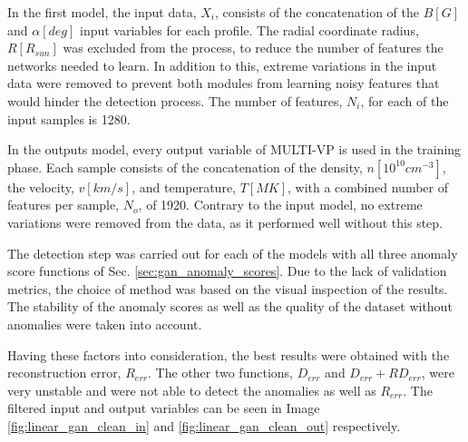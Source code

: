 In the first model, the input data, $X_i$, consists of the concatenation of the $B [G]$ and $\alpha [deg]$ input variables for each profile. The radial coordinate radius, $R [R_{sun}]$ was excluded from the process, to reduce the number of features the networks needed to learn. In addition to this, extreme variations in the input data were removed to prevent both modules from learning noisy features that would hinder the detection process. The number of features, $N_i$, for each of the input samples is 1280.

In the outputs model, every output variable of MULTI-VP is used in the training phase. Each sample consists of the concatenation of the density, $n [10^{10}cm^{-3}]$,  the velocity, $v [km/s]$, and temperature, $T [MK]$, with a combined number of features per sample, $N_o$, of 1920. Contrary to the input model, no extreme variations were removed from the data, as it performed well without this step.

The detection step was carried out for each of the models with all three anomaly score functions of Sec. \ref{sec:gan_anomaly_scores}. Due to the lack of validation metrics, the choice of method was based on the visual inspection of the results. The stability of the anomaly scores as well as the quality of the dataset without anomalies were taken into account.

Having these factors into consideration, the best results were obtained with the reconstruction error, $R_{err}$. The other two functions, $D_{err}$ and $D_{err} + RD_{err}$, were very unstable and were not able to detect the anomalies as well as $R_{err}$. The filtered input and output variables can be seen in Image \ref{fig:linear_gan_clean_in} and \ref{fig:linear_gan_clean_out} respectively.


